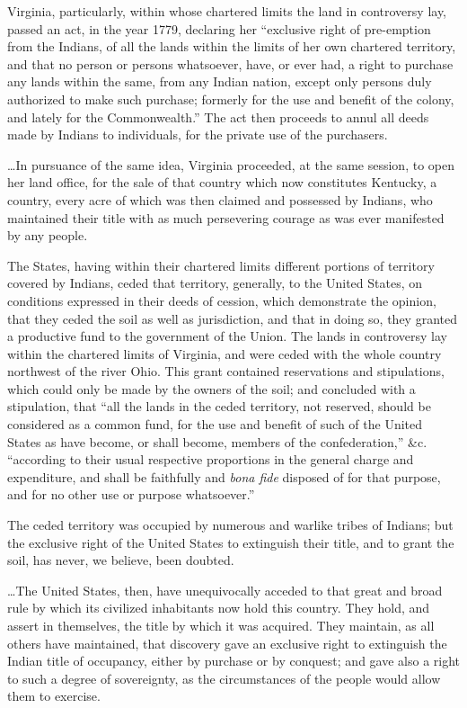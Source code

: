 Virginia, particularly, within whose chartered limits the land in controversy
lay, passed an act, in the year 1779, declaring her ``exclusive right of
pre-emption from the Indians, of all the lands within the limits of her own
chartered territory, and that no person or persons whatsoever, have, or ever
had, a right to purchase any lands within the same, from any Indian nation,
except only persons duly authorized to make such purchase; formerly for the use
and benefit of the colony, and lately for the Commonwealth.'' The act then
proceeds to annul all deeds made by Indians to individuals, for the private use
of the purchasers.

\ldots In pursuance of the same idea, Virginia proceeded, at the same session,
to open her land office, for the sale of that country which now constitutes
Kentucky, a country, every acre of which was then claimed and possessed by
Indians, who maintained their title with as much persevering courage as was ever
manifested by any people.

The States, having within their chartered limits different portions of territory
covered by Indians, ceded that territory, generally, to the United States, on
conditions expressed in their deeds of cession, which demonstrate the opinion,
that they ceded the soil as well as jurisdiction, and that in doing so, they
granted a productive fund to the government of the Union. The lands in
controversy lay within the chartered limits of Virginia, and were ceded with the
whole country northwest of the river Ohio. This grant contained reservations and
stipulations, which could only be made by the owners of the soil; and concluded
with a stipulation, that ``all the lands in the ceded territory, not reserved,
should be considered as a common fund, for the use and benefit of such of the
United States as have become, or shall become, members of the confederation,''
\&c. ``according to their usual respective proportions in the general charge and
expenditure, and shall be faithfully and \textit{bona fide} disposed of for that
purpose, and for no other use or purpose whatsoever.''

The ceded territory was occupied by numerous and warlike tribes of Indians; but
the exclusive right of the United States to extinguish their title, and to grant
the soil, has never, we believe, been doubted.

\ldots The United States, then, have unequivocally acceded to that great and
broad rule by which its civilized inhabitants now hold this country. They hold,
and assert in themselves, the title by which it was acquired. They maintain, as
all others have maintained, that discovery gave an exclusive right to extinguish
the Indian title of occupancy, either by purchase or by conquest; and gave also
a right to such a degree of sovereignty, as the circumstances of the people
would allow them to exercise.

